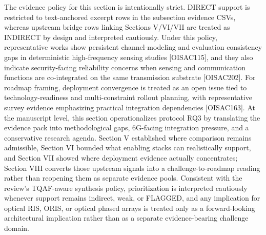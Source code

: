 {}The evidence policy for this section is intentionally strict. DIRECT support is restricted to text-anchored excerpt rows in the subsection evidence CSVs, whereas upstream bridge rows linking Sections V/VI/VII are treated as INDIRECT by design and interpreted cautiously. Under this policy, representative works show persistent channel-modeling and evaluation consistency gaps in deterministic high-frequency sensing studies [O\markdownRendererUnderscore{}ISAC\markdownRendererUnderscore{}115], and they also indicate security-facing reliability concerns when sensing and communication functions are co-integrated on the same transmission substrate [O\markdownRendererUnderscore{}ISAC\markdownRendererUnderscore{}202]. For roadmap framing, deployment convergence is treated as an open issue tied to technology-readiness and multi-constraint rollout planning, with representative survey evidence emphasizing practical integration dependencies [O\markdownRendererUnderscore{}ISAC\markdownRendererUnderscore{}163].\markdownRendererParagraphSeparator
{}At the manuscript level, this section operationalizes protocol RQ3 by translating the evidence pack into methodological gaps, 6G-facing integration pressure, and a conservative research agenda. Section V established where comparison remains admissible, Section VI bounded what enabling stacks can realistically support, and Section VII showed where deployment evidence actually concentrates; Section VIII converts those upstream signals into a challenge-to-roadmap reading rather than reopening them as separate evidence pools. Consistent with the review's TQAF-aware synthesis policy, prioritization is interpreted cautiously whenever support remains indirect, weak, or FLAGGED, and any implication for optical RIS, ORIS, or optical phased arrays is treated only as a forward-looking architectural implication rather than as a separate evidence-bearing challenge domain.\markdownRendererParagraphSeparator
{}\markdownRendererParagraphSeparator
